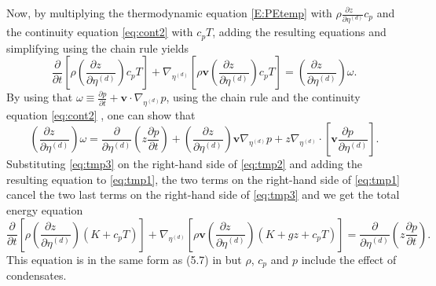 \documentclass{agujournal}
\begin{document}
Now, by multiplying the thermodynamic equation \eqref{E:PEtemp} with $\rho \frac{\partial z\quad }{\partial \eta^{(d)}}c_p$ and the continuity equation \eqref{eq:cont2} with $c_p T$, adding the resulting equations and simplifying using the chain rule yields
\begin{equation}
\frac{\partial }{\partial t}\left[ \rho \left( \frac{\partial z\quad }{\partial \eta^{(d)}}\right)c_p T\right]+\nabla_{\eta^{(d)}} \left[ \rho \mathbf{v} \left( \frac{\partial z\quad }{\partial \eta^{(d)}}\right)c_p T\right]=\left( \frac{\partial z\quad}{\partial \eta^{(d)}}\right)\omega.\label{eq:tmp2}
\end{equation}
By using that $\omega\equiv \frac{\partial p}{\partial t}+\mathbf{v} \cdot \nabla_{\eta^{(d)}} p$, using the chain rule and the continuity equation \eqref{eq:cont2} , one can show that
\begin{equation}
\left( \frac{\partial z\quad}{\partial \eta^{(d)}}\right)\omega = \frac{\partial}{\partial \eta^{(d)}}\left( z\frac{\partial p}{\partial t}\right)+\left( \frac{\partial z}{\partial \eta^{(d)}}\right)\mathbf{v} \nabla_{\eta^{(d)}}p +z \nabla_{\eta^{(d)}}\cdot \left[ \mathbf{v} \frac{\partial p\quad }{\partial \eta^{(d)}}\right].\label{eq:tmp3}
\end{equation}
Substituting \eqref{eq:tmp3} on the right-hand side of \eqref{eq:tmp2} and adding the resulting equation to \eqref{eq:tmp1}, the two terms on the right-hand side of \eqref{eq:tmp1} cancel the two last terms on the right-hand side of \eqref{eq:tmp3} and we get the total energy equation
\begin{equation}
\frac{\partial }{\partial t}\left[ \rho \left( \frac{\partial z\quad }{\partial \eta^{(d)}}\right)\left(K+c_pT\right)\right]+\nabla_{\eta^{(d)}} \left[ \rho \mathbf{v} \left( \frac{\partial z\quad }{\partial \eta^{(d)}}\right) \left( K+gz+c_pT \right) \right]=\frac{\partial}{\partial \eta^{(d)}}\left( z\frac{\partial p}{\partial t}\right).\label{eq:Etotp}
\end{equation}
This equation is in the same form as (5.7) in \cite{K1974MWR} but $\rho$, $c_p$ and $p$ include the effect of condensates. 
\end{document}
